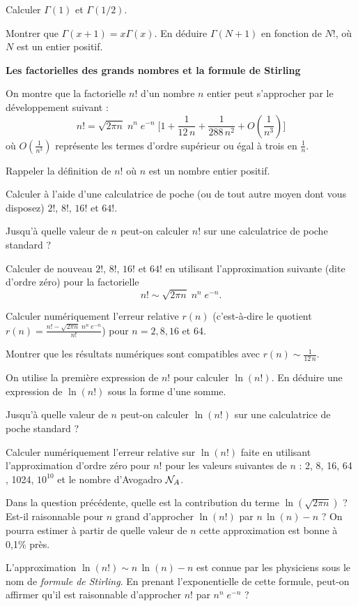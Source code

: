\documentclass[utf8, 11pt]{feuille}
\begin{document}
\question
Calculer $\Gamma(1)$ et $\Gamma (1/2)$.

\question
Montrer que $ \Gamma (x+1) = x \Gamma(x)$. En déduire $\Gamma(N+1)$ en fonction de $N!$, où $N$ est un entier positif.

\bigskip

{\sffamily\bfseries{Les factorielles des grands nombres et la formule de Stirling}}

On montre que la factorielle $n!$ d'un nombre $n$ entier peut s'approcher par le développement suivant : 
$$
\label{eqStirling}
n! = \sqrt{2 \pi n} \; n^n \; e^{-n} \; \Big[ 1 + \frac{1}{12\, n} + \frac{1}{288\, n^2}+ O(\frac{1}{n^3}) \Big]
$$
où $O(\frac{1}{n^3})$ représente les termes d'ordre supérieur ou égal à trois en $\frac{1}{n}$.

\question
Rappeler la définition de $n!$ où $n$ est un nombre entier positif.

\question
Calculer à l'aide d'une calculatrice de poche (ou de tout autre moyen dont vous disposez) $2!$, $8!$, $16!$ et $64!$.

\question
Jusqu'à quelle valeur de $n$ peut-on calculer $n!$ sur une calculatrice de poche standard ?

\question
Calculer de nouveau $2!$, $8!$, $16!$ et $64!$ en utilisant l'approximation suivante (dite d'ordre zéro) pour la factorielle
$$
n! \sim \sqrt{2 \pi n} \; n^n \; e^{-n} .
$$

\question
Calculer numériquement l'erreur relative $r(n)$ (c'est-à-dire le quotient $r(n)=\frac{n!-\sqrt{2 \pi n} \; n^n \; e^{-n}}{n!}$) pour $n=2, 8, 16$ et 64.

\question
Montrer que les résultats numériques sont compatibles avec $\displaystyle{r(n) \sim \frac{1}{12\, n}}$.

\question
On utilise la première expression de $n!$ pour calculer $\ln{(n!)}$. En déduire une expression de $\ln{(n!)}$ sous la forme d'une somme. 

\question
Jusqu'à quelle valeur de $n$ peut-on calculer $\ln{(n!)}$ sur une calculatrice de poche standard ?

\question
Calculer numériquement l'erreur relative sur $\ln{(n!)}$ faite en utilisant l'approximation d'ordre zéro pour $n!$ pour les valeurs suivantes de $n$ : 2, 8, 16, 64 , 1024, $10^{10}$ et le nombre d'Avogadro ${\cal N}_A$.

\question
Dans la question précédente,  quelle est la contribution du terme $\ln{( \sqrt{2 \pi n})}$ ? Est-il raisonnable pour $n$ grand d'approcher $ \ln{(n!)}$ par $n\,\ln{(n)} - n$ ? On pourra estimer à partir de quelle valeur de $n$ cette approximation est bonne à 0,1\% près.

\question
L'approximation $ \ln{(n!)} \sim n\,\ln{(n)} - n$ est connue par les physiciens sous le nom de \textit{formule de Stirling}. En prenant l'exponentielle de cette formule, peut-on affirmer qu'il est raisonnable d'approcher $n!$ par $ n^n \; e^{-n}$ ?
\end{document}
